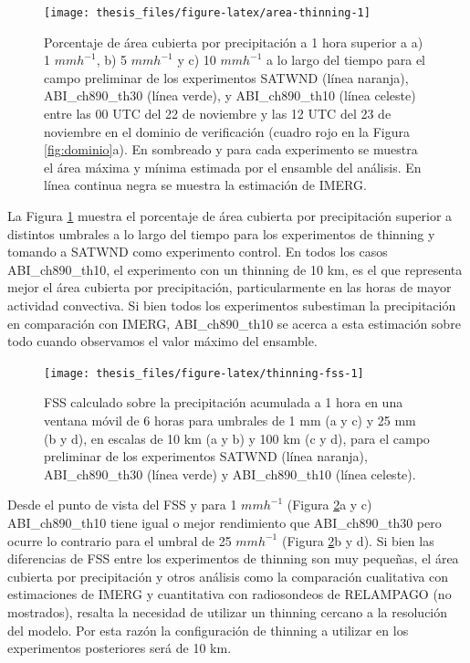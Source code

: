 \documentclass[12pt,oneside,a4paper]{reedthesis}
\begin{document}
\begin{figure}
\texttt{[image: thesis\_files/figure-latex/area-thinning-1]} \caption{Porcentaje de área cubierta por precipitación a 1 hora superior a a) 1 \(mmh^{-1}\), b) 5 \(mmh^{-1}\) y c) 10 \(mmh^{-1}\) a lo largo del tiempo para el campo preliminar de los experimentos SATWND (línea naranja), ABI\_ch890\_th30 (línea verde), y ABI\_ch890\_th10 (línea celeste) entre las 00 UTC del 22 de noviembre y las 12 UTC del 23 de noviembre en el dominio de verificación (cuadro rojo en la Figura \ref{fig:dominio}a). En sombreado y para cada experimento se muestra el área máxima y mínima estimada por el ensamble del análisis. En línea continua negra se muestra la estimación de IMERG.}\label{fig:area-thinning}
\end{figure}
La Figura \ref{fig:area-thinning} muestra el porcentaje de área cubierta por precipitación superior a distintos umbrales a lo largo del tiempo para los experimentos de thinning y tomando a SATWND como experimento control. En todos los casos ABI\_ch890\_th10, el experimento con un thinning de 10 km, es el que representa mejor el área cubierta por precipitación, particularmente en las horas de mayor actividad convectiva. Si bien todos los experimentos subestiman la precipitación en comparación con IMERG, ABI\_ch890\_th10 se acerca a esta estimación sobre todo cuando observamos el valor máximo del ensamble.


\begin{figure}
\texttt{[image: thesis\_files/figure-latex/thinning-fss-1]} \caption{FSS calculado sobre la precipitación acumulada a 1 hora en una ventana móvil de 6 horas para umbrales de 1 mm (a y c) y 25 mm (b y d), en escalas de 10 km (a y b) y 100 km (c y d), para el campo preliminar de los experimentos SATWND (línea naranja), ABI\_ch890\_th30 (línea verde) y ABI\_ch890\_th10 (línea celeste).}\label{fig:thinning-fss}
\end{figure}
Desde el punto de vista del FSS y para 1 \(mm h^{-1}\) (Figura \ref{fig:thinning-fss}a y c) ABI\_ch890\_th10 tiene igual o mejor rendimiento que ABI\_ch890\_th30 pero ocurre lo contrario para el umbral de 25 \(mm h^{-1}\) (Figura \ref{fig:thinning-fss}b y d). Si bien las diferencias de FSS entre los experimentos de thinning son muy pequeñas, el área cubierta por precipitación y otros análisis como la comparación cualitativa con estimaciones de IMERG y cuantitativa con radiosondeos de RELAMPAGO (no mostrados), resalta la necesidad de utilizar un thinning cercano a la resolución del modelo. Por esta razón la configuración de thinning a utilizar en los experimentos posteriores será de 10 km.
\end{document}
